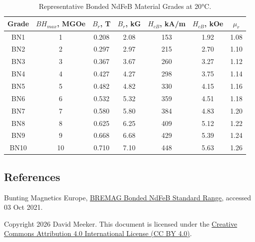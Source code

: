 \documentclass{article}
\begin{document}
\begin{table}
\centering
\begin{tabular}{|c|c|c|c|c|c|c|}
\hline
Grade & \(BH_{max}\), MGOe & \(B_r\), T & \(B_r\), kG & \(H_{cB}\), kA/m & \(H_{cB}\), kOe & \(\mu_r\)\\ \hline \hline
BN1 & 1 & 0.208 & 2.08 & 153 & 1.92 & 1.08\\ \hline
BN2 & 2 & 0.297 & 2.97 & 215 & 2.70 & 1.10\\ \hline
BN3 & 3 & 0.367 & 3.67 & 260 & 3.27 & 1.12\\ \hline
BN4 & 4 & 0.427 & 4.27 & 298 & 3.75 & 1.14\\ \hline
BN5 & 5 & 0.482 & 4.82 & 330 & 4.15 & 1.16\\ \hline
BN6 & 6 & 0.532 & 5.32 & 359 & 4.51 & 1.18\\ \hline
BN7 & 7 & 0.580 & 5.80 & 384 & 4.83 & 1.20\\ \hline
BN8 & 8 & 0.625 & 6.25 & 409 & 5.12 & 1.22\\ \hline
BN9 & 9 & 0.668 & 6.68 & 429 & 5.39 & 1.24\\ \hline
BN10 & 10 & 0.710 & 7.10 & 448 & 5.63 & 1.26\\ \hline
\end{tabular}
\caption{Representative Bonded NdFeB Material Grades at 20°C.}
\end{table}

\subsection*{References}
Bunting Magnetics Europe, \href{https://web.archive.org/web/20210307094900/https://e-magnetsuk.com/wp-content/uploads/2020/06/E-Magnets-UK-Bonded-Neodymium-Data-Sheet.pdf}{BREMAG Bonded NdFeB Standard Range}, accessed 03 Oct 2021.

\noindent Copyright 2026 David Meeker. This document is licensed under the \href{https://creativecommons.org/licenses/by/4.0/}{Creative Commons Attribution 4.0 International License (CC BY 4.0)}.
\end{document}
